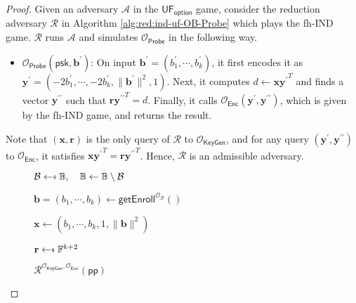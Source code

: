 \begin{proof}

Given an adversary $\mathcal{A}$ in the $\textsf{UF}_\textsf{option}$ game, consider the reduction adversary $\mathcal{R}$ in Algorithm \ref{alg:red:ind-uf-OB-Probe} which plays the \textsf{fh-IND} game. $\mathcal{R}$ runs $\mathcal{A}$ and simulates $\mathcal{O}_{\textsf{Probe}}$ in the following way.

\begin{itemize}

	\item $\mathcal{O}_{\textsf{Probe}}( \textsf{psk}, \mathbf{b}^\prime )$: On input $\mathbf{b}^\prime = (b_1^\prime, \cdots, b_k^\prime)$, it first encodes it as $\mathbf{y}^\prime = (-2b_1^\prime, \cdots, \allowbreak -2b_k^\prime, \|\mathbf{b}^\prime\|^2, 1)$. Next, it computes $d \gets \mathbf{x}{\mathbf{y}^\prime}^T$ and finds a vector $\mathbf{y}^{\prime\prime}$ such that $\mathbf{r}{\mathbf{y}^{\prime\prime}}^T = d$. Finally, it calls $\mathcal{O}_{\textsf{Enc}}(\mathbf{y}^\prime, {\mathbf{y}^{\prime\prime}})$, which is given by the \textsf{fh-IND} game, and returns the result.

\end{itemize}

\noindent Note that $(\mathbf{x}, \mathbf{r})$ is the only query of $\mathcal{R}$ to $\mathcal{O}_{\textsf{KeyGen}}$, and for any query $( \mathbf{y}^\prime, {\mathbf{y}^{\prime\prime}} )$ to $\mathcal{O}_{\textsf{Enc}}$, it satisfies $\mathbf{x}{\mathbf{y}^\prime}^T = \mathbf{r}{\mathbf{y}^{\prime\prime}}^T$. Hence, $\mathcal{R}$ is an admissible adversary.

\begin{figure}[h]
\centering
	
	\begin{minipage}[t]{0.6\linewidth}
	\centering
	\begin{algorithm}[H]
	\caption{$\mathcal{R}^{\mathcal{O}_{\textsf{KeyGen}}, \mathcal{O}_{\textsf{Enc}}}(\textsf{pp})$}
	\label{alg:red:ind-uf-OB-Probe}
	\begin{algorithmic}[1]
		\State $\mathcal{B} \getsdollar \mathbb{B}, \quad \mathbb{B} \gets \mathbb{B} \setminus \mathcal{B}$ \label{alg:red:ind-uf-OB-Probe:B}

		\State $\mathbf{b} = (b_1, \cdots, b_k) \gets \textsf{getEnroll}^{\mathcal{O}_{\mathcal{B}}}()$

		\State $\mathbf{x} \gets (b_1, \cdots, b_k, 1, \|\mathbf{b}\|^2)$

		\State $\mathbf{r} \getsdollar \mathbb{F}^{k+2}$


\end{algorithmic}
\end{algorithm}
\end{minipage}
\end{figure}
\end{proof}

